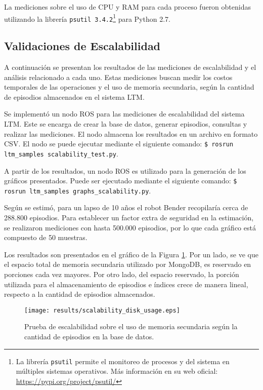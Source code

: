 La mediciones sobre el uso de CPU y RAM para cada proceso fueron obtenidas utilizando la librería \texttt{psutil 3.4.2}\footnote{La librería \texttt{psutil} permite el monitoreo de procesos y del sistema en múltiples sistemas operativos. Más información en su web oficial: \url{https://pypi.org/project/psutil/}} para Python 2.7.


\subsection{Validaciones de Escalabilidad}

A continuación se presentan los resultados de las mediciones de escalabilidad y el análisis relacionado a cada uno. Estas mediciones buscan medir los costos temporales de las operaciones y el uso de memoria secundaria, según la cantidad de episodios almacenados en el sistema LTM.

 Se implementó un nodo ROS para las mediciones de escalabilidad del sistema LTM. Este se encarga de crear la base de datos, generar episodios, consultas y realizar las mediciones. El nodo almacena los resultados en un archivo en formato CSV. El nodo se puede ejecutar mediante el siguiente comando: \texttt{\$ rosrun ltm\_samples scalability\_test.py}.

A partir de los resultados, un nodo ROS es utilizado para la generación de los gráficos presentados. Puede ser ejecutado mediante el siguiente comando:
\texttt{\$ rosrun ltm\_samples graphs\_scalability.py}.

Según se estimó, para un lapso de 10 años el robot Bender recopilaría cerca de 288.800 episodios. Para establecer un factor extra de seguridad en la estimación, se realizaron mediciones con hasta 500.000 episodios, por lo que cada gráfico está compuesto de 50 muestras.

 Los resultados son presentados en el gráfico de la Figura \ref{result:scalability_disk_usage}.  Por un lado, se ve que el espacio total de memoria secundaria utilizado por MongoDB, es reservado en porciones cada vez mayores. Por otro lado, del espacio reservado, la porción utilizada para el almacenamiento de episodios e índices crece de manera lineal, respecto a la cantidad de episodios almacenados.

\begin{figure}[!ht]
	\centering
	\texttt{[image: results/scalability\_disk\_usage.eps]}
	\caption[Escalabilidad: Uso de disco según cantidad de episodios.]
	{\small Prueba de escalabilidad sobre el uso de memoria secundaria  según la cantidad de episodios en la base de datos.}
	\label{result:scalability_disk_usage}
\end{figure}


